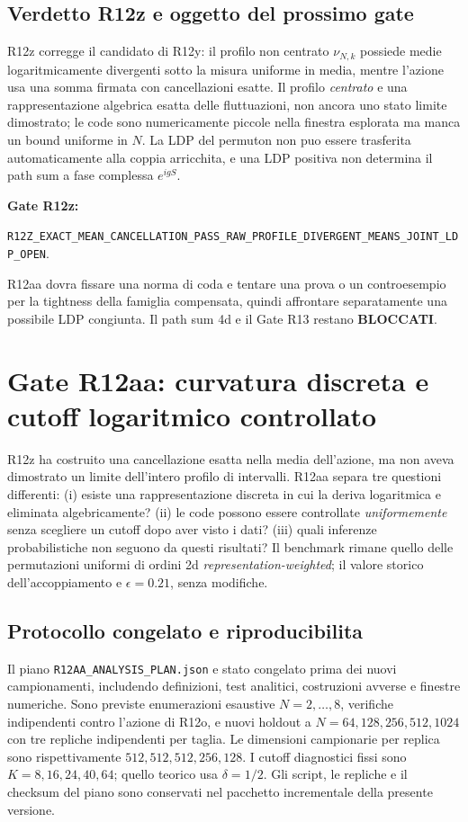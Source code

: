 \documentclass[11pt,a4paper]{article}
\begin{document}
\subsection{Verdetto R12z e oggetto del prossimo gate}

R12z corregge il candidato di R12y: il profilo non centrato $\nu_{N,k}$ possiede medie logaritmicamente divergenti sotto la misura uniforme in media, mentre l'azione usa una somma firmata con cancellazioni esatte. Il profilo \emph{centrato} e una rappresentazione algebrica esatta delle fluttuazioni, non ancora uno stato limite dimostrato; le code sono numericamente piccole nella finestra esplorata ma manca un bound uniforme in $N$. La LDP del permuton non puo essere trasferita automaticamente alla coppia arricchita, e una LDP positiva non determina il path sum a fase complessa $e^{igS}$.

\textbf{Gate R12z:}\par
\nolinkurl{R12Z_EXACT_MEAN_CANCELLATION_PASS_RAW_PROFILE_DIVERGENT_MEANS_JOINT_LDP_OPEN}.

R12aa dovra fissare una norma di coda e tentare una prova o un controesempio per la tightness della famiglia compensata, quindi affrontare separatamente una possibile LDP congiunta. Il path sum 4d e il Gate R13 restano \textbf{BLOCCATI}.


\section{Gate R12aa: curvatura discreta e cutoff logaritmico controllato}
\label{sec:r12aa}

R12z ha costruito una cancellazione esatta nella media dell'azione, ma non aveva dimostrato un limite dell'intero profilo di intervalli. R12aa separa tre questioni differenti: (i) esiste una rappresentazione discreta in cui la deriva logaritmica e eliminata algebricamente? (ii) le code possono essere controllate \emph{uniformemente} senza scegliere un cutoff dopo aver visto i dati? (iii) quali inferenze probabilistiche non seguono da questi risultati? Il benchmark rimane quello delle permutazioni uniformi di ordini 2d \emph{representation-weighted}; il valore storico dell'accoppiamento e $\epsilon=0.21$, senza modifiche.

\subsection{Protocollo congelato e riproducibilita}

Il piano \texttt{R12AA\_ANALYSIS\_PLAN.json} e stato congelato prima dei nuovi campionamenti, includendo definizioni, test analitici, costruzioni avverse e finestre numeriche. Sono previste enumerazioni esaustive $N=2,\ldots,8$, verifiche indipendenti contro l'azione di R12o, e nuovi holdout a $N=64,128,256,512,1024$ con tre repliche indipendenti per taglia. Le dimensioni campionarie per replica sono rispettivamente $512,512,512,256,128$. I cutoff diagnostici fissi sono $K=8,16,24,40,64$; quello teorico usa $\delta=1/2$. Gli script, le repliche e il checksum del piano sono conservati nel pacchetto incrementale della presente versione.
\end{document}
